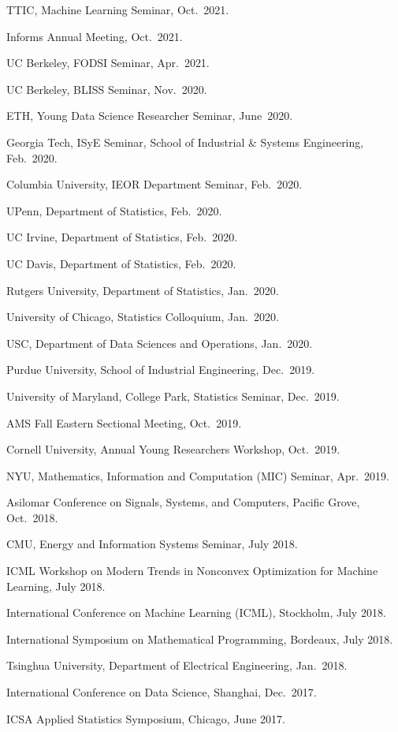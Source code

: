\documentclass[a4paper, 10pt]{article}
\newenvironment{changemargin}[2]{%
  \begin{list}{}{%
    \setlength{\topsep}{0pt}%
    \setlength{\leftmargin}{#1}%
    \setlength{\rightmargin}{#2}%
    \setlength{\listparindent}{\parindent}%
    \setlength{\itemindent}{\parindent}%
    \setlength{\parsep}{\parskip}%
  }%
  \item[]}{\end{list}
}
\newenvironment{body} {
	\vspace*{-16pt}
	\begin{changemargin}{-0.3in}{-0.5in}
  }	
	{\end{changemargin}
}
\begin{document}
\begin{body}
\begin{enumerate}[label={[{T}{{\arabic*}}]}]
	
	\item TTIC, Machine Learning Seminar, Oct.~2021.
	
	\item Informs Annual Meeting, Oct.~2021.
	
	\item UC Berkeley, FODSI Seminar, Apr.~2021. 
	
	\item UC Berkeley, BLISS Seminar, Nov.~2020.
	\item ETH, Young Data Science Researcher Seminar, June~2020.
	\item Georgia Tech, ISyE Seminar, School of Industrial \& Systems Engineering, Feb.~2020.
	\item Columbia University, IEOR Department Seminar, Feb.~2020.
	\item UPenn, Department of Statistics, Feb.~2020.
	\item UC Irvine, Department of Statistics, Feb.~2020.
	\item UC Davis, Department of Statistics, Feb.~2020.
	\item Rutgers University, Department of Statistics, Jan.~2020.
	\item University of Chicago, Statistics Colloquium, Jan.~2020.
	\item USC, Department of Data Sciences and Operations, Jan.~2020.
	\item Purdue University, School of Industrial Engineering, Dec.~2019.
	\item University of Maryland, College Park, Statistics Seminar, Dec.~2019.
	\item AMS Fall Eastern Sectional Meeting, Oct.~2019.
	\item Cornell University, Annual Young Researchers Workshop, Oct.~2019.
	\item NYU, Mathematics, Information and Computation (MIC) Seminar, Apr.~2019.
		\item Asilomar Conference on Signals, Systems, and Computers, Pacific Grove, Oct.~2018.
		\item CMU, Energy and Information Systems Seminar, July 2018.
		\item ICML Workshop on Modern Trends in Nonconvex Optimization for Machine Learning, July 2018.
		\item International Conference on Machine Learning (ICML), Stockholm, July 2018.
		\item International Symposium on Mathematical Programming, Bordeaux, July 2018.
		\item Tsinghua University, Department of Electrical Engineering, Jan.~2018.
			
		\item International Conference on Data Science, Shanghai, Dec.~2017.
		\item ICSA Applied Statistics Symposium, Chicago, June 2017.
		
		\end{enumerate}
\end{body}
\end{document}
